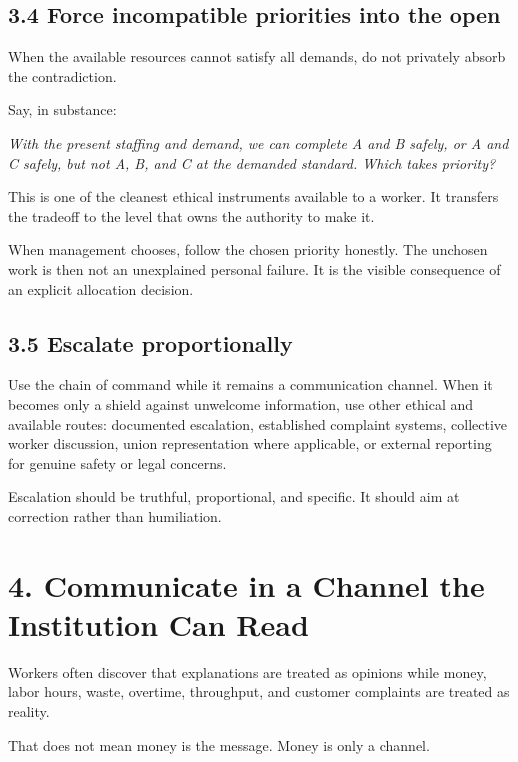 \documentclass[11pt,oneside]{article}
\renewenvironment{quote}
  {\begin{tcolorbox}[
      enhanced,
      breakable,
      colback=ManifestLight,
      colframe=ManifestRule,
      boxrule=0pt,
      leftrule=3pt,
      arc=0pt,
      outer arc=0pt,
      left=10pt,right=10pt,top=8pt,bottom=8pt,
      before skip=0.8em,after skip=0.8em
    ]\itshape}
  {\end{tcolorbox}}
\begin{document}
\subsection{3.4 Force incompatible priorities into the
open}\label{force-incompatible-priorities-into-the-open}

When the available resources cannot satisfy all demands, do not
privately absorb the contradiction.

Say, in substance:

\begin{quote}
With the present staffing and demand, we can complete A and B safely, or
A and C safely, but not A, B, and C at the demanded standard. Which
takes priority?
\end{quote}

This is one of the cleanest ethical instruments available to a worker.
It transfers the tradeoff to the level that owns the authority to make
it.

When management chooses, follow the chosen priority honestly. The
unchosen work is then not an unexplained personal failure. It is the
visible consequence of an explicit allocation decision.

\subsection{3.5 Escalate proportionally}\label{escalate-proportionally}

Use the chain of command while it remains a communication channel. When
it becomes only a shield against unwelcome information, use other
ethical and available routes: documented escalation, established
complaint systems, collective worker discussion, union representation
where applicable, or external reporting for genuine safety or legal
concerns.

Escalation should be truthful, proportional, and specific. It should aim
at correction rather than humiliation.

\section{4. Communicate in a Channel the Institution Can
Read}\label{communicate-in-a-channel-the-institution-can-read}

Workers often discover that explanations are treated as opinions while
money, labor hours, waste, overtime, throughput, and customer complaints
are treated as reality.

That does not mean money is the message. Money is only a channel.
\end{document}

